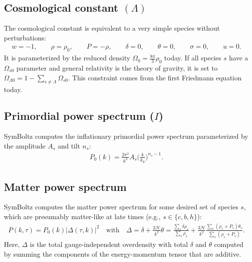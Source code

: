 \documentclass{aa}
\newcommand\scrH{\mathscr{H}}
\begin{document}
\subsection{Cosmological constant \texorpdfstring{$(\Lambda)$}{(Λ)}}
\label{sec:cc}

The cosmological constant is equivalent to a very simple species without perturbations:
\begin{align*}
    w = -1 , \qquad
    \rho = \rho_0, \qquad
    P = -\rho , \qquad
    \delta = 0 , \qquad
    \theta = 0 , \qquad
    \sigma = 0 , \qquad
    u = 0 .
\end{align*}
It is parameterized by the reduced density $\Omega_0 = \frac{8\pi}{3} \rho_0$ today.
If all species $s$ have a $\Omega_{s0}$ parameter and general relativity is the theory of gravity, it is set to $\Omega_{\Lambda 0} = 1 - \sum_{s \neq \Lambda} \Omega_{s0}$.
This constraint comes from the first Friedmann equation today.

\subsection{Primordial power spectrum \texorpdfstring{($I$)}{(I)}}
\label{sec:primordial}

SymBoltz computes the inflationary primordial power spectrum parameterized by the amplitude $A_s$ and tilt $n_s$:
\begin{align*}
    P_0(k) = \frac{2\pi^2}{k^3} A_s \bigg(\frac{k}{k_\text{p}}\bigg)^{n_s-1}.
\end{align*}

\subsection{Matter power spectrum}
\label{sec:matter}

SymBoltz computes the matter power spectrum for some desired set of species $s$, which are presumably matter-like at late times (e.g., $s \in \{c,b,h\}$):
\begin{align*}
    P(k,\tau) = P_0(k) \big|\Delta(\tau,k)\big|^2
    \quad \text{with} \quad
    \Delta = \delta + \frac{3 \scrH}{k^2} \theta = \frac{\sum_s \delta\rho_s}{\sum_s \rho_s} + \frac{3 \scrH}{k^2} \frac{\sum_s (\rho_s+P_s)\theta_s}{\sum_s (\rho_s+P_s)} .
\end{align*}
Here, $\Delta$ is the total gauge-independent overdensity with total $\delta$ and $\theta$ computed by summing the components of the energy-momentum tensor that are additive.
\end{document}
